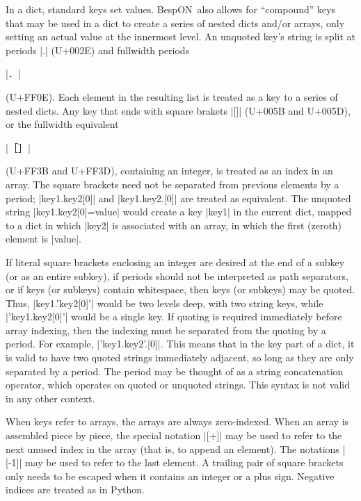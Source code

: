\documentclass[11pt]{article}
\newcommand{\bespon}{BespON}
\begin{document}
In a dict, standard keys set values.  \bespon\ also allows for ``compound'' keys that may be used in a dict to create a series of nested dicts and/or arrays, only setting an actual value at the innermost level.  An unquoted key's string is split at periods |.| (U+002E) and fullwidth periods \begin{CJK*}{UTF8}{gkai}|．|\end{CJK*} (U+FF0E).  Each element in the resulting list is treated as a key to a series of nested dicts.  Any key that ends with square brakets |[]| (U+005B and U+005D), or the fullwidth equivalent \begin{CJK*}{UTF8}{gkai}|［］|\end{CJK*} (U+FF3B and U+FF3D), containing an integer, is treated as an index in an array.  The square brackets need not be separated from previous elements by a period; |key1.key2[0]| and |key1.key2.[0]| are treated as equivalent.  The unquoted string |key1.key2[0]=value| would create a key |key1| in the current dict, mapped to a dict in which |key2| is associated with an array, in which the first (zeroth) element is |value|.

If literal square brackets enclosing an integer are desired at the end of a subkey (or as an entire subkey), if periods should not be interpreted as path separators, or if keys (or subkeys) contain whitespace, then keys (or subkeys) may be quoted.  Thus, |key1.'key2[0]'| would be two levels deep, with two string keys, while |'key1.key2[0]'| would be a single key.  If quoting is required immediately before array indexing, then the indexing must be separated from the quoting by a period.  For example, |'key1.key2'.[0]|. This means that in the key part of a dict, it is valid to have two quoted strings immediately adjacent, so long as they are only separated by a period.  The period may be thought of as a string concatenation operator, which operates on quoted or unquoted strings.  This syntax is not valid in any other context.

When keys refer to arrays, the arrays are always zero-indexed.  When an array is assembled piece by piece, the special notation |[+]| may be used to refer to the next unused index in the array (that is, to append an element).  The notations |[-1]| may be used to refer to the last element.  A trailing pair of square brackets only needs to be escaped when it contains an integer or a plus sign.  Negative indices are treated as in Python.
\end{document}
